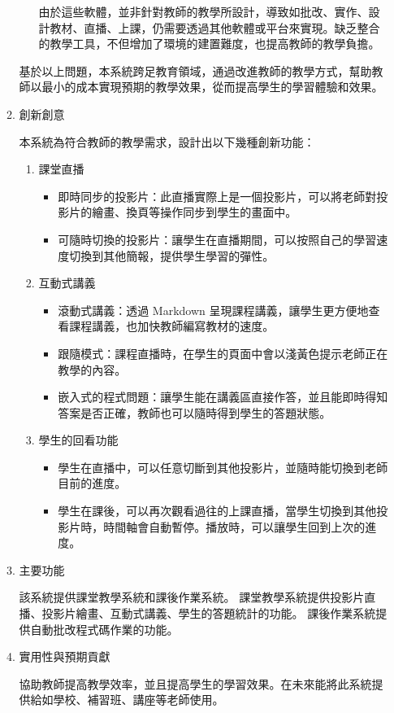 \documentclass[12pt]{article}
\begin{document}
\begin{enumerate}
\begin{enumerate}
\begin{enumerate}[label=(\arabic*)]
        \par 由於這些軟體，並非針對教師的教學所設計，導致如批改、實作、設計教材、直播、上課，仍需要透過其他軟體或平台來實現。缺乏整合的教學工具，不但增加了環境的建置難度，也提高教師的教學負擔。
    \end{enumerate}
    \par 基於以上問題，本系統跨足教育領域，通過改進教師的教學方式，幫助教師以最小的成本實現預期的教學效果，從而提高學生的學習體驗和效果。
    \item 創新創意
      \par 本系統為符合教師的教學需求，設計出以下幾種創新功能：
      \begin{enumerate}[label=(\arabic*)]
        \setlength{\parindent}{2em}
        \item 課堂直播
          \begin{itemize}
            \item 即時同步的投影片：此直播實際上是一個投影片，可以將老師對投影片的繪畫、換頁等操作同步到學生的畫面中。
            \item 可隨時切換的投影片：讓學生在直播期間，可以按照自己的學習速度切換到其他簡報，提供學生學習的彈性。
          \end{itemize}
        \item 互動式講義
          \begin{itemize}
            \item 滾動式講義：透過 Markdown 呈現課程講義，讓學生更方便地查看課程講義，也加快教師編寫教材的速度。
            \item 跟隨模式：課程直播時，在學生的頁面中會以淺黃色提示老師正在教學的內容。
            \item 嵌入式的程式問題：讓學生能在講義區直接作答，並且能即時得知答案是否正確，教師也可以隨時得到學生的答題狀態。
          \end{itemize}
        \item 學生的回看功能
          \begin{itemize}
            \item 學生在直播中，可以任意切斷到其他投影片，並隨時能切換到老師目前的進度。
            \item 學生在課後，可以再次觀看過往的上課直播，當學生切換到其他投影片時，時間軸會自動暫停。播放時，可以讓學生回到上次的進度。
          \end{itemize}
      \end{enumerate}
    \item 主要功能
    \par 該系統提供課堂教學系統和課後作業系統。
    課堂教學系統提供投影片直播、投影片繪畫、互動式講義、學生的答題統計的功能。
    課後作業系統提供自動批改程式碼作業的功能。
    \item 實用性與預期貢獻
    \par 協助教師提高教學效率，並且提高學生的學習效果。在未來能將此系統提供給如學校、補習班、講座等老師使用。
  \end{enumerate}


\end{enumerate}
\end{document}
